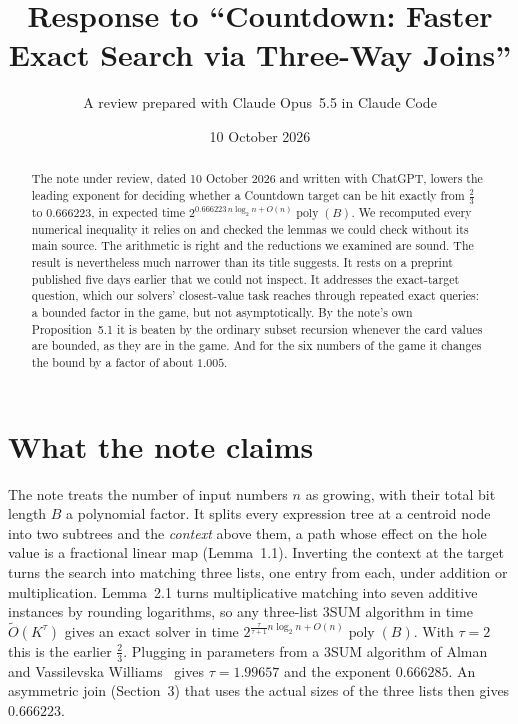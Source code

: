 \documentclass[11pt]{article}
\title{Response to ``Countdown: Faster Exact Search via Three-Way Joins''}
\author{A review prepared with Claude Opus~5.5 in Claude Code}
\date{10 October 2026}
\begin{document}
\maketitle

\begin{abstract}
The note under review, dated 10 October 2026 and written with ChatGPT, lowers the leading exponent for
deciding whether a Countdown target can be hit exactly from $\tfrac23$ to $0.666223$, in expected time
$2^{0.666223\, n \log_2 n + O(n)} \operatorname{poly}(B)$. We recomputed every numerical inequality it
relies on and checked the lemmas we could check without its main source. The arithmetic is right and the
reductions we examined are sound. The result is nevertheless much narrower than its title suggests. It
rests on a preprint published five days earlier that we could not inspect. It addresses the exact-target
question, which our solvers' closest-value task reaches through repeated exact queries: a bounded factor in
the game, but not asymptotically. By the
note's own Proposition~5.1 it is beaten by the ordinary subset recursion whenever the card values are
bounded, as they are in the game. And for the six numbers of the game it changes the bound by a factor of
about $1.005$.
\end{abstract}

\section{What the note claims}

The note treats the number of input numbers $n$ as growing, with their total bit length $B$ a
polynomial factor. It splits every expression tree at a centroid node into two subtrees and the
\emph{context} above them, a path whose effect on the hole value is a fractional linear map
(Lemma~1.1). Inverting the context at the target turns the search into matching three lists, one entry
from each, under addition or multiplication. Lemma~2.1 turns multiplicative matching into seven
additive instances by rounding logarithms, so any three-list 3SUM algorithm in time $\tilde O(K^\tau)$
gives an exact solver in time $2^{\frac{\tau}{\tau+1} n \log_2 n + O(n)} \operatorname{poly}(B)$. With
$\tau = 2$ this is the earlier $\tfrac23$. Plugging in parameters from a 3SUM algorithm of Alman and
Vassilevska Williams~\cite{av} gives $\tau = 1.99657$ and the exponent $0.666285$. An asymmetric join
(Section~3) that uses the actual sizes of the three lists then gives $0.666223$.
\end{document}
